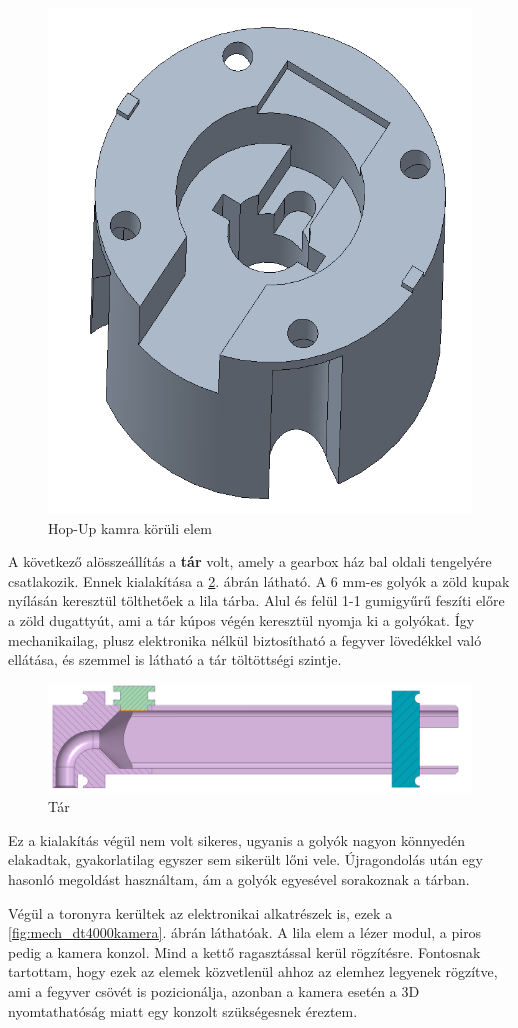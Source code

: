 \documentclass[12pt,a4paper]{article}
\begin{document}
\begin{figure}[h!]
	\centering
	\includegraphics[width=0.4\linewidth]{mech_dt4200}
	\caption{Hop-Up kamra körüli elem}
	\label{fig:mech_dt4200}
\end{figure}


A következő alösszeállítás a \textbf{tár} volt, amely a gearbox ház bal oldali tengelyére csatlakozik. Ennek kialakítása a \ref{fig:mech_tar}. ábrán látható. A 6 mm-es golyók a zöld kupak nyílásán keresztül tölthetőek a lila tárba. Alul és felül 1-1 gumigyűrű feszíti előre a zöld dugattyút, ami a tár kúpos végén keresztül nyomja ki a golyókat. Így mechanikailag, plusz elektronika nélkül biztosítható a fegyver lövedékkel való ellátása, és szemmel is látható a tár töltöttségi szintje.

\begin{figure}[h!]
	\centering
	\includegraphics[width=1\linewidth]{mech_tar}
	\caption{Tár}
	\label{fig:mech_tar}
\end{figure}

Ez a kialakítás végül nem volt sikeres, ugyanis a golyók nagyon könnyedén elakadtak, gyakorlatilag egyszer sem sikerült lőni vele. Újragondolás után egy hasonló megoldást használtam, ám a golyók egyesével sorakoznak a tárban.

Végül a toronyra kerültek az elektronikai alkatrészek is, ezek a \ref{fig:mech_dt4000kamera}. ábrán láthatóak. A lila elem a lézer modul, a piros pedig a kamera konzol. Mind a kettő ragasztással kerül rögzítésre. Fontosnak tartottam, hogy ezek az elemek közvetlenül ahhoz az elemhez legyenek rögzítve, ami a fegyver csövét is pozicionálja, azonban a kamera esetén a 3D nyomtathatóság miatt egy konzolt szükségesnek éreztem.
\end{document}
